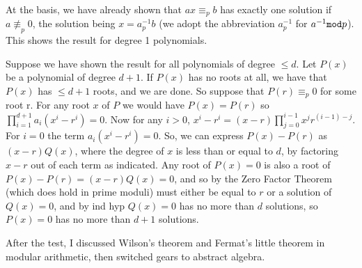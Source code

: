 \documentclass[12pt]{article}
\begin{document}
At the basis, we have already shown that $ax \equiv_p b$ has exactly one solution if $a \not\equiv_p 0$, the solution being $x = a^{-1}_p b$  (we adopt the abbreviation $a^{-1}_p$ for $a^{-1}{\tt mod} p$).  This shows the result for degree 1 polynomials.

Suppose we have shown the result for all polynomials of degree $\leq d$.  Let $P(x)$ be a polynomial of degree $d+1$.   If $P(x)$ has no roots at all, we have that
$P(x)$ has $\leq d+1$ roots, and we are done.  So suppose that $P(r)\equiv_p 0$ for some root r.  For any root $x$ of $P$ we would have $P(x)= P(r)$ so
$\prod_{i=1}^{d+1} a_i(x^i-r^i) = 0$.  Now for any $i>0$, $x^i - r^i = (x-r)\prod_{j=0}^{i-1}x^jr^{(i-1)-j}$.  For $i=0$ the term $a_i(x^i-r^i) = 0$.  So, we can express
$P(x)-P(r)$ as $(x-r)Q(x)$, where the degree of $x$ is less than or equal to $d$, by factoring $x-r$ out of each term as indicated.   Any root of $P(x)=0$ is also a root
of $P(x)-P(r) = (x-r)Q(x) = 0$, and so by the Zero Factor Theorem (which does hold in prime moduli) must either be equal to $r$ or a solution of $Q(x)=0$, and by ind hyp
$Q(x)=0$ has no more than $d$ solutions, so $P(x)=0$ has no more than $d+1$ solutions.

After the test, I discussed Wilson's theorem and Fermat's little theorem in modular arithmetic, then switched gears to abstract algebra.
\end{document}
